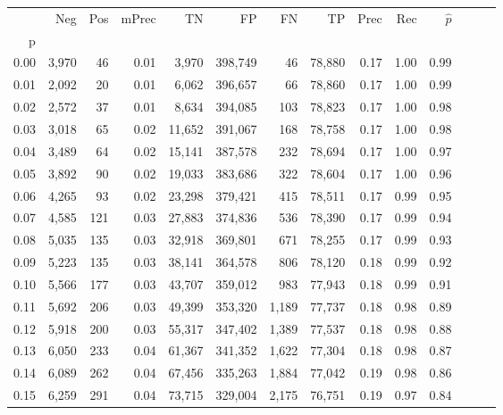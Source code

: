 \begin{tabular}{rrrrrrrrrrrrrr}
\toprule
{} &    Neg &    Pos & mPrec &       TN &       FP &      FN &      TP &  Prec &   Rec & $\hat{p}$ \\
p    &        &        &       &          &          &         &         &       &       &           \\
\midrule
0.00 &  3,970 &     46 &  0.01 &    3,970 &  398,749 &      46 &  78,880 &  0.17 &  1.00 &      0.99 \\
0.01 &  2,092 &     20 &  0.01 &    6,062 &  396,657 &      66 &  78,860 &  0.17 &  1.00 &      0.99 \\
0.02 &  2,572 &     37 &  0.01 &    8,634 &  394,085 &     103 &  78,823 &  0.17 &  1.00 &      0.98 \\
0.03 &  3,018 &     65 &  0.02 &   11,652 &  391,067 &     168 &  78,758 &  0.17 &  1.00 &      0.98 \\
0.04 &  3,489 &     64 &  0.02 &   15,141 &  387,578 &     232 &  78,694 &  0.17 &  1.00 &      0.97 \\
0.05 &  3,892 &     90 &  0.02 &   19,033 &  383,686 &     322 &  78,604 &  0.17 &  1.00 &      0.96 \\
0.06 &  4,265 &     93 &  0.02 &   23,298 &  379,421 &     415 &  78,511 &  0.17 &  0.99 &      0.95 \\
0.07 &  4,585 &    121 &  0.03 &   27,883 &  374,836 &     536 &  78,390 &  0.17 &  0.99 &      0.94 \\
0.08 &  5,035 &    135 &  0.03 &   32,918 &  369,801 &     671 &  78,255 &  0.17 &  0.99 &      0.93 \\
0.09 &  5,223 &    135 &  0.03 &   38,141 &  364,578 &     806 &  78,120 &  0.18 &  0.99 &      0.92 \\
0.10 &  5,566 &    177 &  0.03 &   43,707 &  359,012 &     983 &  77,943 &  0.18 &  0.99 &      0.91 \\
0.11 &  5,692 &    206 &  0.03 &   49,399 &  353,320 &   1,189 &  77,737 &  0.18 &  0.98 &      0.89 \\
0.12 &  5,918 &    200 &  0.03 &   55,317 &  347,402 &   1,389 &  77,537 &  0.18 &  0.98 &      0.88 \\
0.13 &  6,050 &    233 &  0.04 &   61,367 &  341,352 &   1,622 &  77,304 &  0.18 &  0.98 &      0.87 \\
0.14 &  6,089 &    262 &  0.04 &   67,456 &  335,263 &   1,884 &  77,042 &  0.19 &  0.98 &      0.86 \\
0.15 &  6,259 &    291 &  0.04 &   73,715 &  329,004 &   2,175 &  76,751 &  0.19 &  0.97 &      0.84 \\

\end{tabular}
